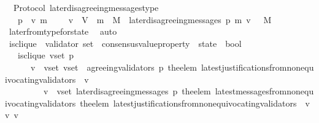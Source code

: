 \begin{isabellebody}
\isanewline
{}\isamarkupfalse%
\ {\isacharparenleft}\ Protocol{\isacharparenright}\ later{\isacharunderscore}disagreeing{\isacharunderscore}messages{\isacharunderscore}type\ {\isacharcolon}\isanewline
\ \ {\isachardoublequoteopen}{\isasymforall}\ p\ {\isasymsigma}\ v\ m{\isachardot}\ {\isasymsigma}\ {\isasymin}\ {\isasymSigma}\ {\isasymand}\ v\ {\isasymin}\ V\ {\isasymand}\ m\ {\isasymin}\ M\ {\isasymlongrightarrow}\ later{\isacharunderscore}disagreeing{\isacharunderscore}messages\ {\isacharparenleft}p{\isacharcomma}\ m{\isacharcomma}\ v{\isacharcomma}\ {\isasymsigma}{\isacharparenright}\ {\isasymsubseteq}\ M{\isachardoublequoteclose}\isanewline
%
\isadelimproof
\ \ %
\endisadelimproof
%
\isatagproof
{}\isamarkupfalse%
\ later{\isacharunderscore}from{\isacharunderscore}type{\isacharunderscore}for{\isacharunderscore}state\ \isamarkupfalse%
\ auto%
\endisatagproof
{\isafoldproof}%
%
\isadelimproof
\isanewline
%
\endisadelimproof
\isanewline
\isanewline
\isanewline
\isanewline
\isanewline
\isanewline
\isanewline
{}\isamarkupfalse%
\ is{\isacharunderscore}clique\ {\isacharcolon}{\isacharcolon}\ {\isachardoublequoteopen}{\isacharparenleft}validator\ set\ {\isacharasterisk}\ consensus{\isacharunderscore}value{\isacharunderscore}property\ {\isacharasterisk}\ state{\isacharparenright}\ {\isasymRightarrow}\ bool{\isachardoublequoteclose}\isanewline
\ \isanewline
\ \ \ {\isachardoublequoteopen}is{\isacharunderscore}clique\ {\isacharparenleft}v{\isacharunderscore}set{\isacharcomma}\ p{\isacharcomma}\ {\isasymsigma}{\isacharparenright}\ {\isacharequal}\ \isanewline
\ \ \ \ \ {\isacharparenleft}{\isasymforall}\ v\ {\isasymin}\ v{\isacharunderscore}set{\isachardot}\ v{\isacharunderscore}set\ {\isasymsubseteq}\ agreeing{\isacharunderscore}validators\ {\isacharparenleft}p{\isacharcomma}\ the{\isacharunderscore}elem\ {\isacharparenleft}latest{\isacharunderscore}justifications{\isacharunderscore}from{\isacharunderscore}non{\isacharunderscore}equivocating{\isacharunderscore}validators\ {\isasymsigma}\ v{\isacharparenright}{\isacharparenright}\isanewline
\ \ \ \ \ {\isasymand}\ \ {\isacharparenleft}{\isasymforall}\ \ v{\isacharprime}\ {\isasymin}\ v{\isacharunderscore}set{\isachardot}\ later{\isacharunderscore}disagreeing{\isacharunderscore}messages\ {\isacharparenleft}p{\isacharcomma}\ the{\isacharunderscore}elem\ {\isacharparenleft}latest{\isacharunderscore}messages{\isacharunderscore}from{\isacharunderscore}non{\isacharunderscore}equivocating{\isacharunderscore}validators\ {\isacharparenleft}the{\isacharunderscore}elem\ {\isacharparenleft}latest{\isacharunderscore}justifications{\isacharunderscore}from{\isacharunderscore}non{\isacharunderscore}equivocating{\isacharunderscore}validators\ {\isasymsigma}\ v{\isacharparenright}{\isacharparenright}\ v{\isacharprime}{\isacharparenright}{\isacharcomma}\ v{\isacharprime}{\isacharcomma}\ {\isasymsigma}{\isacharparenright}\ {\isacharequal}\ {\isasymemptyset}{\isacharparenright}{\isacharparenright}{\isachardoublequoteclose}\isanewline

\end{isabellebody}
